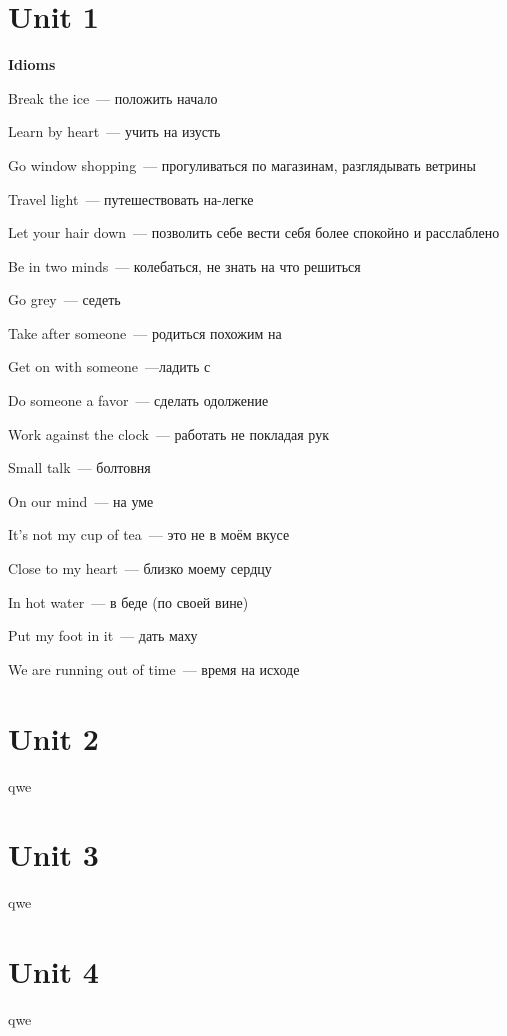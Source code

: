 \documentclass[10pt,a4paper]{article}
\begin{document}
\section{Unit 1}
\textbf{Idioms}

\noindent
Break the ice~--- положить начало

\noindent
Learn by heart~--- учить на изусть

\noindent
Go window shopping~--- прогуливаться по магазинам, разглядывать ветрины

\noindent
Travel light~--- путешествовать на-легке

\noindent
Let your hair down~--- позволить себе вести себя более спокойно и расслаблено

\noindent
Be in two minds~--- колебаться, не знать на что решиться

\noindent
Go grey~--- седеть

\noindent
Take after someone~--- родиться похожим на

\noindent
Get on with someone~---ладить с 

\noindent
Do someone a favor~--- сделать одолжение

\noindent
Work against the clock~--- работать не покладая рук

\noindent
Small talk~--- болтовня

\noindent
On our mind~--- на уме

\noindent
It's not my cup of tea~--- это не в моём вкусе

\noindent
Close to my heart~--- близко моему сердцу

\noindent
In hot water~--- в беде (по своей вине)

\noindent
Put my foot in it~--- дать маху

\noindent
We are running out of time~--- время на исходе



\section{Unit 2}
qwe



\section{Unit 3}
qwe



\section{Unit 4}
qwe
\end{document}
